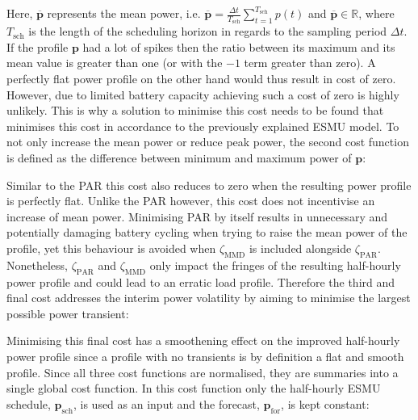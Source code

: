 Here, $\overline{\textbf{p}}$ represents the mean power, i.e. $\overline{\textbf{p}} = \frac{\Delta t}{T_\text{sch}}\sum_{t=1}^{T_\text{sch}}p(t)$ and $\overline{\textbf{p}} \in \mathbb{R}$, where $T_\text{sch}$ is the length of the scheduling horizon in regards to the sampling period $\Delta t$.
If the profile $\textbf{p}$ had a lot of spikes then the ratio between its maximum and its mean value is greater than one (or with the $-1$ term greater than zero).
A perfectly flat power profile on the other hand would thus result in cost of zero.
However, due to limited battery capacity achieving such a cost of zero is highly unlikely.
This is why a solution to minimise this cost needs to be found that minimises this cost in accordance to the previously explained ESMU model.
To not only increase the mean power or reduce peak power, the second cost function is defined as the difference between minimum and maximum power of $\textbf{p}$:




Similar to the PAR this cost also reduces to zero when the resulting power profile is perfectly flat.
Unlike the PAR however, this cost does not incentivise an increase of mean power.
Minimising PAR by itself results in unnecessary and potentially damaging battery cycling when trying to raise the mean power of the profile, yet this behaviour is avoided when $\zeta_\text{MMD}$ is included alongside $\zeta_\text{PAR}$.
Nonetheless, $\zeta_\text{PAR}$ and $\zeta_\text{MMD}$ only impact the fringes of the resulting half-hourly power profile and could lead to an erratic load profile.
Therefore the third and final cost addresses the interim power volatility by aiming to minimise the largest possible power transient:




Minimising this final cost has a smoothening effect on the improved half-hourly power profile since a profile with no transients is by definition a flat and smooth profile.
Since all three cost functions are normalised, they are summaries into a single global cost function.
In this cost function only the half-hourly ESMU schedule, $\textbf{p}_\text{sch}$, is used as an input and the forecast, $\textbf{p}_\text{for}$, is kept constant:

